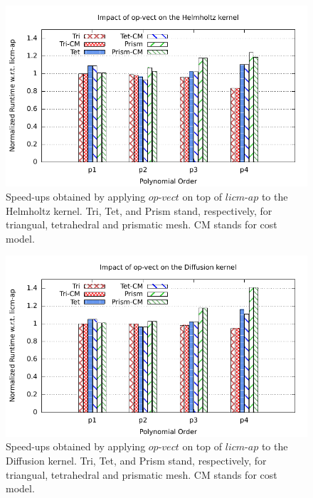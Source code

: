 \documentclass[conference]{IEEEtran}
\begin{document}
\begin{figure}[h]
\includegraphics[scale=0.7]{Pictures/helmholtz-normalized-opvect.pdf}
\caption{Speed-ups obtained by applying $op$-$vect$ on top of $licm$-$ap$ to the Helmholtz kernel. Tri, Tet, and Prism stand, respectively, for triangual, tetrahedral and prismatic mesh. CM stands for cost model.}
\label{fig:opvect-helmholtz-speedup}
\end{figure}

\begin{figure}[h]
\includegraphics[scale=0.7]{Pictures/diffusion-normalized-opvect.pdf}
\caption{Speed-ups obtained by applying $op$-$vect$ on top of $licm$-$ap$ to the Diffusion kernel. Tri, Tet, and Prism stand, respectively, for triangual, tetrahedral and prismatic mesh. CM stands for cost model.}
\label{fig:opvect-diffusion-speedup}
\end{figure}
\end{document}

